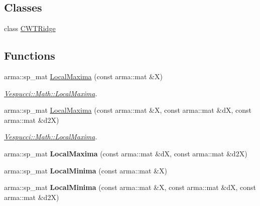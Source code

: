 \subsection*{Classes}
\begin{DoxyCompactItemize}
\item 
class \hyperlink{class_vespucci_1_1_math_1_1_c_w_t_ridge}{C\+W\+T\+Ridge}
\end{DoxyCompactItemize}
\subsection*{Functions}
\begin{DoxyCompactItemize}
\item 
arma\+::sp\+\_\+mat \hyperlink{namespace_vespucci_1_1_math_a0ae415aafa638d49a2ee5b2816bdf7ec}{Local\+Maxima} (const arma\+::mat \&X)
\begin{DoxyCompactList}\small\item\em \hyperlink{namespace_vespucci_1_1_math_a0ae415aafa638d49a2ee5b2816bdf7ec}{Vespucci\+::\+Math\+::\+Local\+Maxima}. \end{DoxyCompactList}\item 
arma\+::sp\+\_\+mat \hyperlink{namespace_vespucci_1_1_math_ae5214109e423583abf4dfa8c71223343}{Local\+Maxima} (const arma\+::mat \&X, const arma\+::mat \&d\+X, const arma\+::mat \&d2\+X)
\begin{DoxyCompactList}\small\item\em \hyperlink{namespace_vespucci_1_1_math_a0ae415aafa638d49a2ee5b2816bdf7ec}{Vespucci\+::\+Math\+::\+Local\+Maxima}. \end{DoxyCompactList}\item 
\hypertarget{namespace_vespucci_1_1_math_a1422b7165b9083556e665f6bd9bf436f}{arma\+::sp\+\_\+mat {\bfseries Local\+Maxima} (const arma\+::mat \&d\+X, const arma\+::mat \&d2\+X)}\label{namespace_vespucci_1_1_math_a1422b7165b9083556e665f6bd9bf436f}

\item 
\hypertarget{namespace_vespucci_1_1_math_a72d209bf07859fa53f1f6aadf1d0a37b}{arma\+::sp\+\_\+mat {\bfseries Local\+Minima} (const arma\+::mat \&X)}\label{namespace_vespucci_1_1_math_a72d209bf07859fa53f1f6aadf1d0a37b}

\item 
\hypertarget{namespace_vespucci_1_1_math_ab06ee701a990bd32f2a635a85b8ea169}{arma\+::sp\+\_\+mat {\bfseries Local\+Minima} (const arma\+::mat \&X, const arma\+::mat \&d\+X, const arma\+::mat \&d2\+X)}\label{namespace_vespucci_1_1_math_ab06ee701a990bd32f2a635a85b8ea169}


\end{DoxyCompactItemize}

